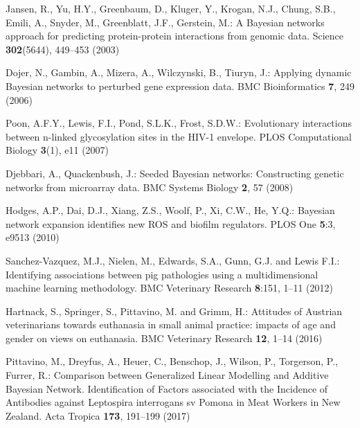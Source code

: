 \begin{thebibliography}{99.}%
%
%



Jansen, R., Yu, H.Y., Greenbaum, D., Kluger, Y., Krogan, N.J., Chung, S.B.,
  Emili, A., Snyder, M., Greenblatt, J.F., Gerstein, M.: A Bayesian networks
  approach for predicting protein-protein interactions from genomic data.
\newblock Science \textbf{302}(5644), 449--453 (2003)

Dojer, N., Gambin, A., Mizera, A., Wilczynski, B., Tiuryn, J.: Applying dynamic
  Bayesian networks to perturbed gene expression data.
\newblock BMC Bioinformatics \textbf{7}, 249 (2006)

Poon, A.F.Y., Lewis, F.I., Pond, S.L.K., Frost, S.D.W.: Evolutionary
  interactions between n-linked glycosylation sites in the HIV-1 envelope.
\newblock PLOS Computational Biology \textbf{3}(1), e11 (2007)

Djebbari, A., Quackenbush, J.: Seeded Bayesian networks: Constructing genetic
  networks from microarray data.
\newblock BMC Systems Biology \textbf{2}, 57 (2008)


Hodges, A.P., Dai, D.J., Xiang, Z.S., Woolf, P., Xi, C.W., He, Y.Q.: Bayesian
  network expansion identifies new ROS and biofilm regulators.
\newblock PLOS One \textbf{5}:3, e9513 (2010)

Sanchez-Vazquez, M.J., Nielen, M., Edwards, S.A., Gunn, G.J. and Lewis F.I.: 
Identifying associations between pig pathologies using a 
multidimensional machine learning methodology. BMC  Veterinary Research \textbf{8}:151, 1--11 (2012)


Hartnack, S., Springer, S., Pittavino, M. and Grimm, H.: Attitudes of Austrian veterinarians towards euthanasia in small animal practice: impacts of age and gender on views on euthanasia. BMC  Veterinary Research \textbf{12}, 1--14 (2016)

Pittavino, M., Dreyfus, A., Heuer, C., Benschop, J., Wilson, P., Torgerson, P., Furrer, R.: Comparison between Generalized Linear Modelling and Additive Bayesian Network. Identification of Factors associated with the Incidence of Antibodies against Leptospira interrogans sv Pomona in Meat Workers in New Zealand. Acta Tropica \textbf{173}, 191--199 (2017)



\end{thebibliography}
